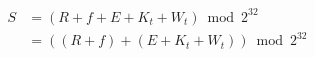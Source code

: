 \documentclass[border=2pt]{standalone}
\begin{document}
\Large
\(\begin{aligned}
S &= (R + f + E + K_t + W_t) \bmod 2^{32} \\
  &= ((R + f) + (E + K_t + W_t)) \bmod 2^{32}
\end{aligned}\)
\end{document}
